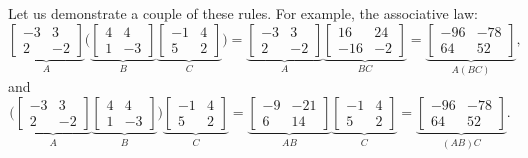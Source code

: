 \begin{example}
Let us demonstrate a couple of these rules.  For example, the associative
law:
\begin{equation*}
\underbrace{
\begin{bmatrix}
-3 & 3 \\ 2 & -2
\end{bmatrix}
}_A
\biggl(
\underbrace{
\begin{bmatrix}
4 & 4 \\ 1 & -3
\end{bmatrix}
}_B
\underbrace{
\begin{bmatrix}
-1 & 4 \\ 5 & 2
\end{bmatrix}
}_C
\biggr)
=
\underbrace{
\begin{bmatrix}
-3 & 3 \\ 2 & -2
\end{bmatrix}
}_A
\underbrace{
\begin{bmatrix}
16 & 24 \\ -16 & -2
\end{bmatrix}
}_{BC}
=
\underbrace{
\begin{bmatrix}
-96 & -78 \\ 64 & 52
\end{bmatrix}
}_{A(BC)} ,
\end{equation*}
and
\begin{equation*}
\biggl(
\underbrace{
\begin{bmatrix}
-3 & 3 \\ 2 & -2
\end{bmatrix}
}_A
\underbrace{
\begin{bmatrix}
4 & 4 \\ 1 & -3
\end{bmatrix}
}_B
\biggr)
\underbrace{
\begin{bmatrix}
-1 & 4 \\ 5 & 2
\end{bmatrix}
}_C
=
\underbrace{
\begin{bmatrix}
-9 & -21 \\ 6 & 14
\end{bmatrix}
}_{AB}
\underbrace{
\begin{bmatrix}
-1 & 4 \\ 5 & 2
\end{bmatrix}
}_C
=
\underbrace{
\begin{bmatrix}
-96 & -78 \\ 64 & 52
\end{bmatrix}
}_{(AB)C} .
\end{equation*}

\end{example}
